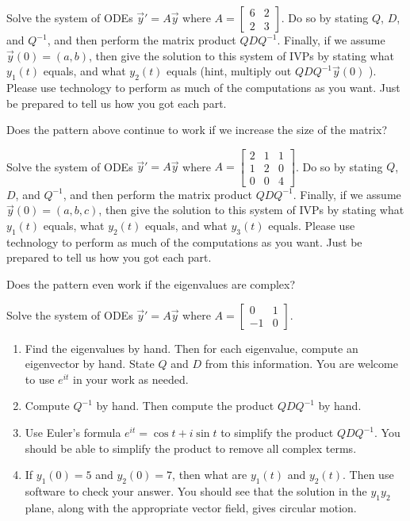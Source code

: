 \begin{problem}
 Solve the system of ODEs $\vec y '=A\vec y$ where 
$A
=\begin{bmatrix}
  6&2\\2&3
 \end{bmatrix}
$. Do so by stating $Q$, $D$, and $Q^{-1}$, and then perform the matrix product $QDQ^{-1}$. Finally, if we assume $\vec y(0) = (a,b)$, then give the solution to this system of IVPs by stating what $y_1(t)$ equals, and what $y_2(t)$ equals (hint, multiply out $QDQ^{-1}\vec y(0)$  ).  Please use technology to perform as much of the computations as you want. Just be prepared to tell us how you got each part.
\end{problem}

Does the pattern above continue to work if we increase the size of the matrix?
\begin{problem}
 Solve the system of ODEs $\vec y '=A\vec y$ where 
$A
=\begin{bmatrix}
  2&1&1\\1&2&0\\0&0&4
 \end{bmatrix}
$. Do so by stating $Q$, $D$, and $Q^{-1}$, and then perform the matrix product $QDQ^{-1}$. Finally, if we assume $\vec y(0) = (a,b,c)$, then give the solution to this system of IVPs by stating what $y_1(t)$ equals, what $y_2(t)$ equals, and what $y_3(t)$ equals. Please use technology to perform as much of the computations as you want. Just be prepared to tell us how you got each part.
\end{problem}

Does the pattern even work if the eigenvalues are complex?
\begin{problem}
 Solve the system of ODEs $\vec y '=A\vec y$ where 
$A
=\begin{bmatrix}
  0&1\\-1&0
 \end{bmatrix}
$. 
\begin{enumerate}
 \item Find the eigenvalues by hand.  Then for each eigenvalue, compute an eigenvector by hand. State $Q$ and $D$ from this information.  You are welcome to use $e^{it}$ in your work as needed.
 \item Compute $Q^{-1}$ by hand.  Then compute the product $QDQ^{-1}$ by hand.
 \item Use Euler's formula $e^{it} = \cos t +i\sin t$ to simplify the product $QDQ^{-1}$. You should be able to simplify the product to remove all complex terms.
 \item If $y_1(0)=5$ and $y_2(0)=7$, then what are $y_1(t)$ and $y_2(t)$. Then use software to check your answer. You should see that the solution in the $y_1y_2$ plane, along with the appropriate vector field, gives circular motion.
\end{enumerate}

\end{problem}

